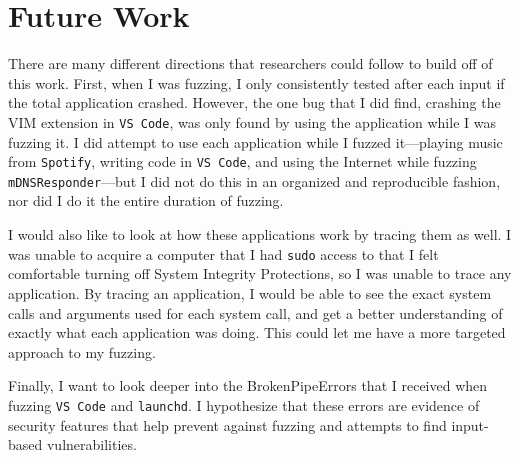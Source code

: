 \chapter{Future Work}
\label{sec:futureWork}
There are many different directions that researchers could follow to build off of this work.  First, when I was fuzzing, I only consistently tested after each input if the total application crashed.  However, the one bug that I did find, crashing the VIM extension in \texttt{VS Code}, was only found by using the application while I was fuzzing it.  I did attempt to use each application while I fuzzed it---playing music from \texttt{Spotify}, writing code in \texttt{VS Code}, and using the Internet while fuzzing \texttt{mDNSResponder}---but I did not do this in an organized and reproducible fashion, nor did I do it the entire duration of fuzzing.

I would also like to look at how these applications work by tracing them as well.  I was unable to acquire a computer that I had \texttt{sudo} access to that I felt comfortable turning off System Integrity Protections, so I was unable to trace any application.  By tracing an application, I would be able to see the exact system calls and arguments used for each system call, and get a better understanding of exactly what each application was doing.  This could let me have a more targeted approach to my fuzzing.

Finally, I want to look deeper into the BrokenPipeErrors that I received when fuzzing \texttt{VS Code} and \texttt{launchd}.  I hypothesize that these errors are evidence of security features that help prevent against fuzzing and attempts to find input-based vulnerabilities.
